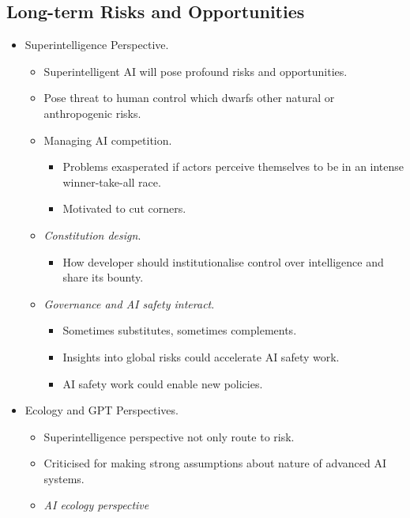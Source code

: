 \subsection{Long-term Risks and Opportunities}

\begin{itemize}
    \item Superintelligence Perspective.
    \begin{itemize}
        \item Superintelligent AI will pose profound risks and opportunities.
        \item Pose threat to human control which dwarfs other natural or anthropogenic risks.
        \item Managing AI competition.
        \begin{itemize}
            \item Problems exasperated if actors perceive themselves to be in an intense winner-take-all race.
            \item Motivated to cut corners.
        \end{itemize}
        \item \emph{Constitution design}.
        \begin{itemize}
            \item How developer should institutionalise control over intelligence and share its bounty.
        \end{itemize}
        \item \emph{Governance and AI safety interact}.
        \begin{itemize}
            \item Sometimes substitutes, sometimes complements.
            \item Insights into global risks could accelerate AI safety work.
            \item AI safety work could enable new policies.
        \end{itemize}
    \end{itemize}
    \item Ecology and GPT Perspectives.
    \begin{itemize}
        \item Superintelligence perspective not only route to risk.
        \item Criticised for making strong assumptions about nature of advanced AI systems.
        \item \emph{AI ecology perspective}
        \begin{itemize}

\end{itemize}
\end{itemize}
\end{itemize}
